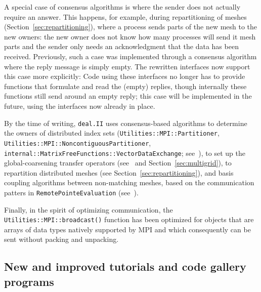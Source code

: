 \documentclass{ansarticle-preprint}
\newcommand{\specialword}[1]{\texttt{#1}}
\newcommand{\dealii}{{\specialword{deal.II}}\xspace}
\begin{document}
A special case of consensus algorithms is where the sender does not
actually require an answer. This happens, for example, during repartitioning
of meshes (Section~\ref{sec:repartitioning}), where a process sends parts of
the new mesh to the new owners: the new owner does not know how many processes
will send it mesh parts and the sender only needs an acknowledgment that the
data has been received. Previously, such a case was implemented through a consensus
algorithm where the reply message is simply empty.
The rewritten interfaces now support this case more explicitly: Code using
these interfaces no longer has to provide functions that formulate
and read the (empty) replies, though internally these functions still
send around an empty reply; this case will be implemented in the
future, using the interfaces now already in place.

By the time of writing, \dealii uses consensus-based algorithms to determine
the owners of distributed index sets (\texttt{Utilities::MPI::Partitioner},
\texttt{Utilities::MPI::Noncontiguous\allowbreak Partitioner}, \texttt{internal::MatrixFreeFunctions::VectorDataExchange}; see~\cite{dealII91}),
to set up the global-coarsening transfer operators (see~\cite{dealII92} and
Section~\ref{sec:multigrid}), to repartition distributed meshes (see Section~\ref{sec:repartitioning}), and basis coupling algorithms between non-matching
meshes, based on the communication patters in \texttt{RemotePointeEvaluation} (see~\cite{dealII92}).

Finally, in the spirit of optimizing communication, the
\texttt{Utilities::MPI::broadcast()} function has been optimized for
objects that are arrays of data types natively supported by MPI and
which consequently can be sent without packing and unpacking.





\subsection{New and improved tutorials and code gallery programs}
\label{subsec:steps}
\end{document}
